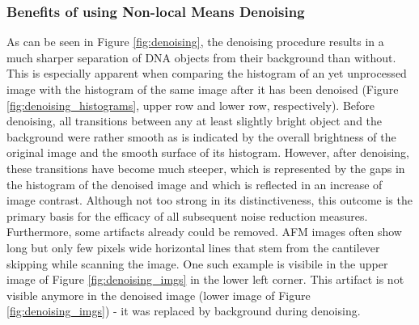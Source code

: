 \documentclass{article}
\begin{document}
\subsubsection{Benefits of using Non-local Means Denoising}
As can be seen in Figure \ref{fig:denoising}, the denoising procedure results in a much sharper separation of DNA objects from their background than without. This is especially apparent when comparing the histogram of an yet unprocessed image with the histogram of the same image after it has been denoised (Figure \ref{fig:denoising_histograms}, upper row and lower row, respectively). Before denoising, all transitions between any at least slightly bright object and the background were rather smooth as is indicated by the overall brightness of the original image and the smooth surface of its histogram. However, after denoising, these transitions have become much steeper, which is represented by the gaps in the histogram of the denoised image and which is reflected in an increase of image contrast. Although not too strong in its distinctiveness, this outcome is the primary basis for the efficacy of all subsequent noise reduction measures.\\

Furthermore, some artifacts already could be removed. AFM images often show long but only few pixels wide horizontal lines that stem from the cantilever skipping while scanning the image. One such example is visibile in the upper image of Figure \ref{fig:denoising_imgs} in the lower left corner. This artifact is not visible anymore in the denoised image (lower image of Figure \ref{fig:denoising_imgs}) - it was replaced by background during denoising.
\end{document}
